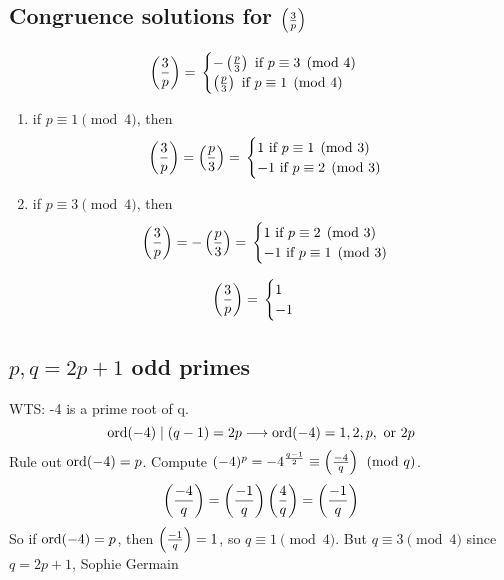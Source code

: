     \subsection{Congruence solutions for $\left( \frac{3}{p} \right) $}
    \[
        \left( \frac{3}{p} \right)  = \\
        \begin{cases}
            -\left( \frac{p}{3} \right)  \text{ if } p\equiv 3\pmod{4} \\
            \left( \frac{p}{3} \right)  \text{ if } p\equiv 1\pmod{4} 
        \end{cases}
    \]
    \begin{enumerate}
        \item if $p\equiv 1\pmod{4}$, then 
        \[
            \left( \frac{3}{p} \right)  = \left( \frac{p}{3} \right)  = \\
            \begin{cases}
                1 \text{ if } p\equiv 1\pmod{3} \\
                -1 \text{ if } p\equiv 2\pmod{3}
            \end{cases}
        \]
        \item if $p\equiv 3\pmod{4}$, then 
        \[
            \left( \frac{3}{p} \right)  = -\left( \frac{p}{3} \right)  = \\
            \begin{cases}
                1 \text{ if } p\equiv 2\pmod{3} \\
                -1 \text{ if } p\equiv 1\pmod{3}
            \end{cases}
        \]
    \end{enumerate}
    \[
        \left( \frac{3}{p} \right)  = \\
        \begin{cases}
            1 \\
            -1 
        \end{cases}
    \]
    
    \subsection{$p,q=2p+1$ odd primes}
    WTS: -4 is a prime root of q. 
    \[
        \operatorname{ord}(-4) \mid (q-1) = 2p \longrightarrow \operatorname{ord}(-4) = 1, 2, p, \text{ or } 2p
    \]
    Rule out $\operatorname{ord}(-4) = p$. 
    Compute $(-4)^p = -4^{\frac{q-1}{2}} \equiv \left( \frac{-4}{q} \right) \pmod{q}$.
    \[
        \left( \frac{-4}{q} \right)  = \left( \frac{-1}{q} \right) \left( \frac{4}{q} \right)  = \left( \frac{-1}{q} \right) 
    \]
    So if $\operatorname{ord}(-4) = p$, then $\left( \frac{-1}{q} \right)  = 1$, so $q\equiv 1\pmod{4}$.
    But $q\equiv 3\pmod{4}$ since $q=2p+1$, Sophie Germain

